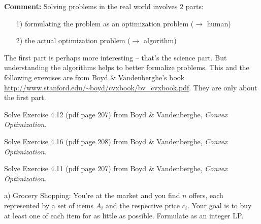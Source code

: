 

\renewcommand{\course}{Maths for Intelligent Systems}
\renewcommand{\coursedate}{Summer 2019}

\renewcommand{\exnum}{Exercise 9 LEFT OUT}

\exercises

\exercisestitle



\textbf{Comment:} Solving problems in the real world involves 2 parts:
\begin{enumerate}
\item[1)] formulating the problem as an optimization problem ($\to$ human)
\item[2)] the actual optimization problem ($\to$ algorithm)
\end{enumerate}
The first part is perhaps more interesting -- that's the science
part. But understanding the algorithms helps to better formalize
problems. This and the following exercises are from Boyd \&
Vandenberghe's book
\url{http://www.stanford.edu/~boyd/cvxbook/bv_cvxbook.pdf}. They are only about the first part.


Solve Exercise 4.12 (pdf page 207) from  Boyd \& Vandenberghe,
\emph{Convex Optimization.}



Solve Exercise 4.16 (pdf page 208) from  Boyd \& Vandenberghe,
\emph{Convex Optimization.}



Solve Exercise 4.11 (pdf page 207) from  Boyd \& Vandenberghe,
\emph{Convex Optimization.}



a) Grocery Shopping: You're at the market and you find $n$ offers,
each represented by a set of items $A_i$ and the respective price
$c_i$. Your goal is to buy at least one of each item for as little as
possible. Formulate as an integer LP.

